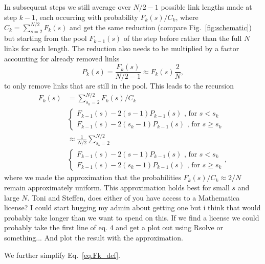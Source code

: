 \documentclass[
reprint,
twocolumn,
amsmath,amssymb,superscriptaddress,aps,
pre]{revtex4-1}
\newcommand{\red}[1]{\textcolor{red!80!black}{#1}}
\newcommand{\blue}[1]{\textcolor{blue!80!black}{#1}}
\begin{document}
In subsequent steps we \blue{still average over $N/2-1$ possible link lengths made at step $k-1$, each occurring with probability $F_k(s)/C_k$, where $C_k=\sum_{s=2}^{N/2}F_k(s)$ and} get the same reduction \blue{(compare Fig.~\ref{fig:schematic})} but starting from the pool $F_{k-1}(s)$ of the step before rather than the full $N$ links for each length. The reduction also needs to be multiplied by a factor \blue{accounting for already removed links}
\blue{\begin{equation}
    P_k(s)=\frac{F_k(s)}{N/2-1} \approx F_k(s)\frac{2}{N},
    \label{eq.Pk}
\end{equation}}
to only remove links that are still in the pool. This leads to the recursion
\blue{\begin{align}
    F_k(s)&= \sum_{s_k=2}^{N/2} F_k(s)/C_k\nonumber \\
    &{\begin{cases}
     F_{k-1}(s)-2(s-1) P_{k-1}(s) \text{ , for } s<s_k\\
     F_{k-1}(s)-2(s_k -1)P_{k-1}(s)\text{ , for } s\geq s_k
    \end{cases}}\nonumber \\
    &\approx \frac{1}{N/2} \sum_{s_k=2}^{N/2} \nonumber \\
    &{\begin{cases}
     F_{k-1}(s)-2(s-1) P_{k-1}(s) \text{ , for } s<s_k\\
     F_{k-1}(s)-2(s_k -1)P_{k-1}(s)\text{ , for } s\geq s_k
    \end{cases}},
    \label{eq.Fk_def}
\end{align}}
\blue{where we made the approximation that the probabilities $F_k(s)/C_k\approx 2/N$ remain approximately uniform. This approximation holds best for small $s$ and large $N$.} \red{Toni and Steffen, does either of you have access to a Mathematica license? I could start bugging my admin about getting one but i think that would probably take longer than we want to spend on this. If we find a license we could probably take the first line of eq. 4 and get a plot out using Rsolve or something...  And plot the result with the approximation.}

\blue{We further simplify Eq.~\ref{eq.Fk_def}.}
\end{document}
